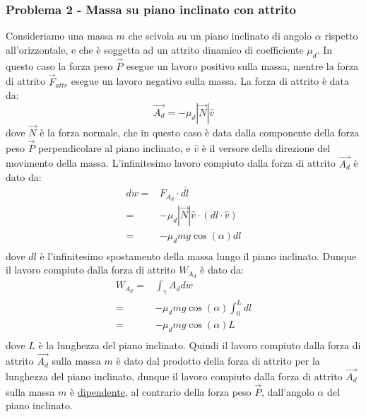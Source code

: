         \subsubsection{Problema 2 - Massa su piano inclinato con attrito}
            Consideriamo una massa $m$ che scivola su un piano inclinato di angolo $\alpha$ rispetto all'orizzontale, e che è soggetta ad un attrito dinamico di coefficiente $\mu_d$.\newline
            In questo caso la forza peso $\vec{P}$ esegue un lavoro positivo sulla massa, mentre la forza di attrito $\vec{F}_{attr}$ esegue un lavoro negativo sulla massa. La forza di attrito è data da:
            $$
                \vec{A_d}= -\mu_d \left|\vec{N}\right|\hat{v}
            $$
            dove $\vec{N}$ è la forza normale, che in questo caso è data dalla componente della forza peso $\vec{P}$ perpendicolare al piano inclinato, e $\hat{v}$ è il versore della direzione del movimento della massa. L'infinitesimo lavoro compiuto dalla forza di attrito $\vec{A_d}$ è dato da:
            $$
                \begin{aligned}
                    dw=& F_{A_d} \cdot d\hat{l} \\
                    =& -\mu_d \left|\vec{N}\right|\hat{v} \cdot (dl\cdot \hat{v})\\
                    =& -\mu_d mg\cos (\alpha) dl\\
                \end{aligned}
            $$
            dove $dl$ è l'infinitesimo spostamento della massa lungo il piano inclinato. Dunque il lavoro compiuto dalla forza di attrito $W_{A_d}$ è dato da:
            $$
                \begin{aligned}
                    W_{A_d} =& \int_{\gamma} A_d dw\\
                    =& -\mu_d mg\cos(\alpha)\int_0^L dl\\
                    =& -\mu_d mg\cos(\alpha) L\\
                \end{aligned}
            $$
            dove $L$ è la lunghezza del piano inclinato. Quindi il lavoro compiuto dalla forza di attrito $\vec{A_d}$ sulla massa $m$ è dato dal prodotto della forza di attrito per la lunghezza del piano inclinato, dunque il lavoro compiuto dalla forza di attrito $\vec{A_d}$ sulla massa $m$ è \underline{dipendente}, al contrario della forza peso $\vec{P}$, dall'angolo $\alpha$ del piano inclinato.
